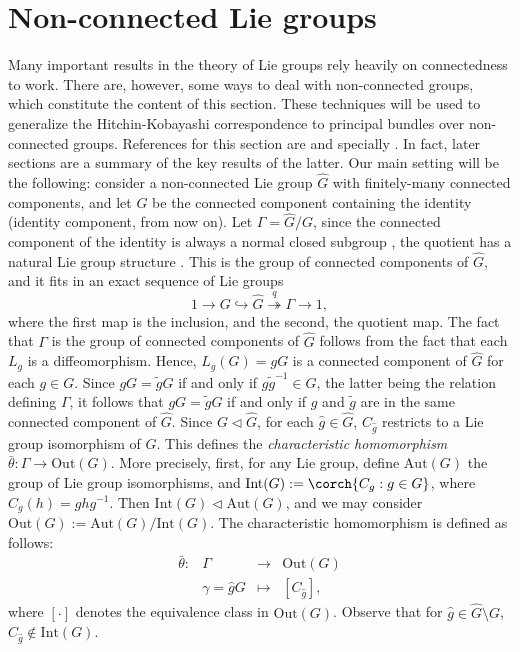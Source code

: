 \section{Non-connected Lie groups} \label{appendix_non_connected_lie_groups}
Many important results in the theory of Lie groups rely heavily on connectedness to work. There are, however, some ways to deal with non-connected groups, which constitute the content of this section. These techniques will be used to generalize the Hitchin-Kobayashi correspondence to principal bundles over non-connected groups. References for this section are \parencite[Ch. 18]{hilgert2011structure} and specially \parencite{barajas2023non}. In fact, later sections are a summary of the key results of the latter. Our main setting will be the following: consider a non-connected Lie group \(\hat{G}\) with finitely-many connected components, and let \(G\) be the connected component containing the identity (identity component, from now on). Let \(\Gamma=\hat{G}/G\), since the connected component of the identity is always a normal closed subgroup \parencite[Prop. 7.15]{lee_introSM}, the quotient has a natural Lie group structure \parencite[Th. 21.26]{lee_introSM}. This is the group of connected components of \(\hat{G}\), and it fits in an exact sequence of Lie groups
\begin{equation} \label{eq_sequence_Lie_groups}
1 \to G \hookrightarrow \hat{G}  \overset{q}{\twoheadrightarrow} \Gamma \to 1,
\end{equation}
where the first map is the inclusion, and the second, the quotient map. The fact that \(\Gamma\) is the group of connected components of \(\hat{G}\) follows from the fact that each \(L_g\) is a diffeomorphism. Hence, \(L_g(G)=gG\) is a connected component of \(\hat{G}\) for each \(g\in G\). Since \(gG=\tilde{g}G\) if and only if \(g\tilde{g}^{-1}\in G\), the latter being the relation defining \(\Gamma\), it follows that \(gG=\tilde{g}G\) if and only if \(g\) and \(\tilde{g}\) are in the same connected component of \(\hat{G}\). Since \(G \triangleleft \hat{G}\), for each \(\hat{g} \in \hat{G}\), \(C_{\hat{g}}\) restricts to a Lie group isomorphism of \(G\). This defines the \textit{characteristic homomorphism} \(\bar{\theta}\colon \Gamma \to \mathrm{Out}(G)\). More precisely, first, for any Lie group, define \(\mathrm{Aut}(G)\) the group of Lie group isomorphisms, and \(\mathrm{Int}(G):=\corch{C_g:g \in G}\), where \(C_g(h)=ghg^{-1}\). Then \(\mathrm{Int}(G) \triangleleft \mathrm{Aut}(G)\), and we may consider \(\mathrm{Out}(G):=\mathrm{Aut}(G)/\mathrm{Int}(G)\). The characteristic homomorphism is defined as follows: 
\begin{equation} \label{eq_def_bartheta}
\begin{array}{cccc}
    \bar{\theta}\colon & \Gamma & \longrightarrow & \mathrm{Out}(G) \\
     & \gamma = \hat{g} G & \mapsto & [C_{\hat{g}}],
\end{array}
\end{equation}
where \([\cdot]\) denotes the equivalence class in \(\mathrm{Out}(G)\). Observe that for \(\hat{g}\in \hat{G}\setminus G\), \(C_{\hat{g}}\notin \mathrm{Int}(G)\). \\

